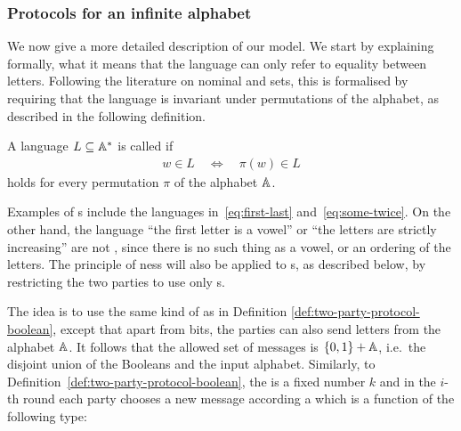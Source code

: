 


\subsubsection{Protocols for an infinite alphabet}
\label{sec:protocols-infinite-alphabet}
We now give a more detailed description of our model. We start by explaining formally, what it means that the
language can only refer to equality between letters. Following the literature on nominal and  sets, this is formalised by requiring that the language is invariant under permutations of the alphabet, as described in the following definition.

\begin{definition} \label{def:equivariant-language}
    A language $L \subseteq \mathbb A^*$ is called  if 
    \begin{align*}
    w \in L \quad \iff \quad \pi(w) \in L
    \end{align*}
    holds for every permutation $\pi$ of the alphabet $\mathbb A$.
\end{definition}

Examples of s include the languages in~\eqref{eq:first-last} and~\eqref{eq:some-twice}. On the other hand, the language ``the first letter is a vowel'' or ``the letters are strictly increasing'' are not , since there is no such thing as a vowel, or an ordering of the letters. The principle of ness will also be applied to s, as described below, by restricting the two parties to use only s.





The idea is to use the same kind of  as in Definition \ref{def:two-party-protocol-boolean}, except that apart from bits, the parties can also send letters from the alphabet $\mathbb A$. It follows that the allowed set of messages is 
$\{0,1\} + \mathbb A$, i.e.~the disjoint union of the Booleans and the input alphabet. Similarly, to Definition~\ref{def:two-party-protocol-boolean}, the  is a fixed number $k$ and in the $i$-th round each party chooses 
a new message according a  which is a function of the following type: 

